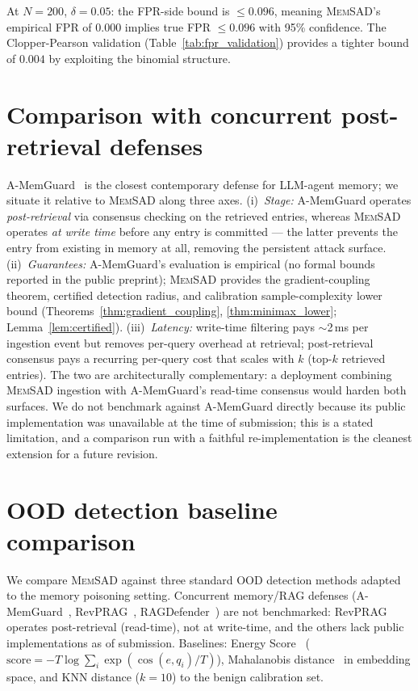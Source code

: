 \documentclass{article}
\theoremstyle{definition}
\newcommand{\memsad}{\textnormal{\textsc{MemSAD}}}
\DeclareMathOperator{\cosim}{cos}
\begin{document}
At $N = 200$, $\delta = 0.05$: the FPR-side bound is $\leq 0.096$, meaning \memsad{}'s empirical FPR of $0.000$ implies true FPR $\leq 0.096$ with 95\% confidence. The Clopper-Pearson validation (Table~\ref{tab:fpr_validation}) provides a tighter bound of $0.004$ by exploiting the binomial structure.

\section{Comparison with concurrent post-retrieval defenses}
\label{app:amemguard}

A-MemGuard~\citep{amemguard2025} is the closest contemporary defense for LLM-agent memory; we situate it relative to \memsad{} along three axes. (i)~\emph{Stage:} A-MemGuard operates \emph{post-retrieval} via consensus checking on the retrieved entries, whereas \memsad{} operates \emph{at write time} before any entry is committed --- the latter prevents the entry from existing in memory at all, removing the persistent attack surface. (ii)~\emph{Guarantees:} A-MemGuard's evaluation is empirical (no formal bounds reported in the public preprint); \memsad{} provides the gradient-coupling theorem, certified detection radius, and calibration sample-complexity lower bound (Theorems~\ref{thm:gradient_coupling}, \ref{thm:minimax_lower}; Lemma~\ref{lem:certified}). (iii)~\emph{Latency:} write-time filtering pays $\sim$2\,ms per ingestion event but removes per-query overhead at retrieval; post-retrieval consensus pays a recurring per-query cost that scales with $k$ (top-$k$ retrieved entries). The two are architecturally complementary: a deployment combining \memsad{} ingestion with A-MemGuard's read-time consensus would harden both surfaces. We do not benchmark against A-MemGuard directly because its public implementation was unavailable at the time of submission; this is a stated limitation, and a comparison run with a faithful re-implementation is the cleanest extension for a future revision.

\section{OOD detection baseline comparison}
\label{app:ood}

We compare \memsad{} against three standard OOD detection methods adapted to the memory poisoning setting. Concurrent memory/RAG defenses (A-MemGuard~\citep{amemguard2025}, RevPRAG~\citep{tan2025revprag}, RAGDefender~\citep{ragdefender2025}) are not benchmarked: RevPRAG operates post-retrieval (read-time), not at write-time, and the others lack public implementations as of submission. Baselines: Energy Score~\citep{liu2020energy} ($\text{score} = -T \log \sum_i \exp(\cosim(e, q_i)/T)$), Mahalanobis distance~\citep{lee2018simple} in embedding space, and KNN distance ($k=10$) to the benign calibration set.
\end{document}
